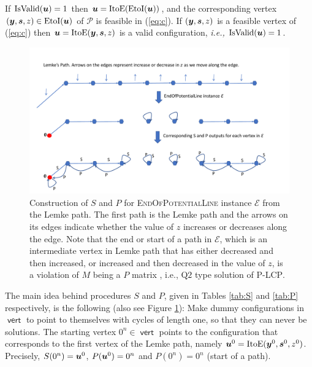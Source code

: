 \documentclass[a4paper,UKenglish]{lipics2}
\theoremstyle{definition}
\def\problem#1{\textsc{#1}}
\def\EOPL{\problem{EndOfPotentialLine}\xspace}
\def\PLCP{\problem{P-LCP}\xspace}
\def\ite{\mbox{ItoE}}
\def\eti{\mbox{EtoI}}
\def\isvalid{\mbox{IsValid}}
\def\PLt{\mbox{Q2}}
\def\vert{\operatorname{\mathsf{vert}}}
\newcommand{\CPol}{\mbox{${\mathcal P}$}}
\newcommand{\CE}{\mbox{${\mathcal E}$}}
\newcommand{\yy}{\mbox{\boldmath $y$}}
\newcommand{\uu}{\mbox{\boldmath $u$}}
\newcommand{\ps}{\mbox{\boldmath $s$}}
\begin{document}
\begin{lemma}\label{lem:vert}
If $\isvalid(\uu)=1$ then $\uu=\ite(\eti(\uu))$, and the corresponding vertex $(\yy,\ps,z)\in \eti(\uu)$ of $\CPol$ is feasible in (\ref{eq:c}). If $(\yy,\ps,z)$ is a feasible vertex of (\ref{eq:c}) then $\uu=\ite(\yy,\ps,z)$ is a valid configuration, {\em i.e.,} $\isvalid(\uu)=1$.
\end{lemma}

\begin{figure}[htbp]
   \centering
\vspace{-1cm}

  \includegraphics[width=\textwidth]{plcp-fig.pdf}
 \caption{Construction of $S$ and $P$ for \EOPL instance $\CE$ from the Lemke
 	path. The first path is the Lemke path and the arrows on its edges indicate
 	whether the value of $z$ increases or decreases along the edge.  Note that
 	the end or start of a path in $\CE$, which is an intermediate vertex in
 	Lemke path that has either decreased and then increased, or increased and then
 	decreased in the value of $z$, is a violation of $M$ being a $P$ matrix
 	\cite{cottle2009linear}, i.e., $\PLt$ type solution of
 	\PLCP.}
 	\label{fig:path}
\end{figure}   


The main idea behind procedures $S$ and $P$, given in Tables \ref{tab:S} and
\ref{tab:P} respectively, is the following (also see Figure \ref{fig:path}):
Make dummy configurations in $\vert$ to point to themselves with cycles of
length one, so that they can never be solutions. 
The starting vertex $0^n \in \vert$ points to the configuration that corresponds
to the first vertex of the Lemke path, namely $\uu^0=\ite(\yy^0,\ps^0,z^0)$. 
Precisely, $S(0^n)=\uu^0$, $P(\uu^0)=0^n$ and $P(0^n)=0^n$ (start of
a path). 
\end{document}
